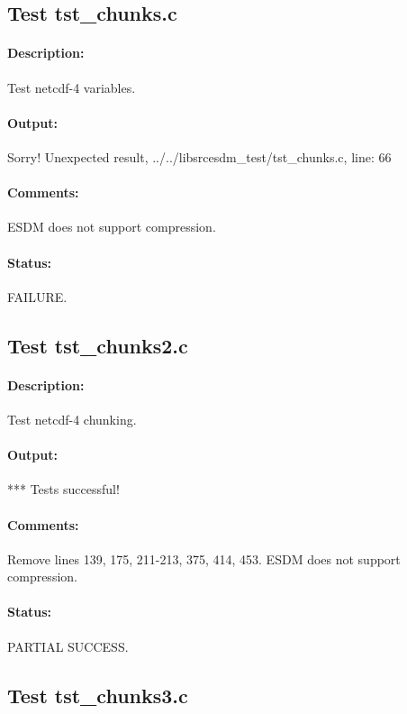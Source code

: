 \subsection{Test tst\_chunks.c}

\paragraph{Description:} Test netcdf-4 variables.

\paragraph{Output:} Sorry! Unexpected result, ../../libsrcesdm\_test/tst\_chunks.c, line: 66

\paragraph{Comments:} ESDM does not support compression.

\paragraph{Status:} FAILURE.

\subsection{Test tst\_chunks2.c}

\paragraph{Description:} Test netcdf-4 chunking.

\paragraph{Output:} *** Tests successful!

\paragraph{Comments:} Remove lines 139, 175, 211-213, 375, 414, 453. ESDM does not support compression.

\paragraph{Status:} PARTIAL SUCCESS.

\subsection{Test tst\_chunks3.c}

